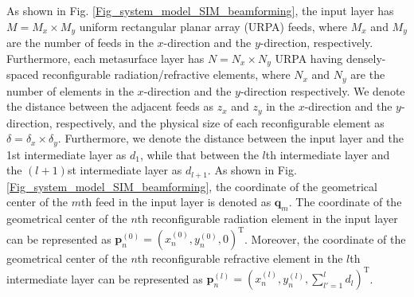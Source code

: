 \documentclass[lettersize,journal]{IEEEtran}
\theoremstyle{remark}
\begin{document}
As shown in Fig. \ref{Fig_system_model_SIM_beamforming}, the input layer has $M=M_x\times M_y$ uniform rectangular planar array (URPA) feeds, where $M_x$ and $M_y$ are the number of feeds in the $x$-direction and the $y$-direction, respectively. Furthermore, each metasurface layer has $N=N_x\times N_y$ URPA having densely-spaced reconfigurable radiation/refractive elements, where $N_x$ and $N_y$ are the number of elements in the $x$-direction and the $y$-direction respectively. We denote the distance between the adjacent feeds as $z_x$ and $z_y$ in the $x$-direction and the $y$-direction, respectively, and the physical size of each reconfigurable element as $\delta=\delta_x\times\delta_y$. Furthermore, we denote the distance between the input layer and the 1st intermediate layer as $d_1$, while that between the $l$th intermediate layer and the $(l+1)$st intermediate layer as $d_{l+1}$. As shown in Fig. \ref{Fig_system_model_SIM_beamforming}, the coordinate of the geometrical center of the $m$th feed in the input layer is denoted as $\mathbf{q}_m$. The coordinate of the geometrical center of the $n$th reconfigurable radiation element in the input layer can be represented as $\mathbf{p}_n^{(0)}=(x_n^{(0)},y_n^{(0)},0)^\mathrm{T}$. Moreover, the coordinate of the geometrical center of the $n$th reconfigurable refractive element in the $l$th intermediate layer can be represented as $\mathbf{p}_n^{(l)}=(x_n^{(l)},y_n^{(l)},\sum_{l'=1}^{l}d_l)^\mathrm{T}$.
\end{document}
